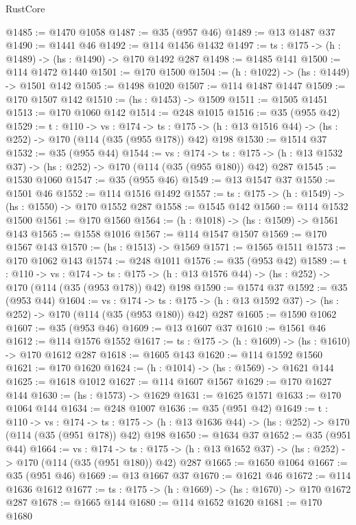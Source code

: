 \begin{lexlean}{RustCore}
\begin{coremodule}
@1485 := @1470 @1058
@1487 := @35 (@957 @46)
@1489 := @13 @1487 @37
@1490 := @1441 @46
@1492 := @114 @1456 @1432
@1497 := {ts : @175} -> (h : @1489) -> (hs : @1490) -> @170 @1492 @287
@1498 := @1485 @141
@1500 := @114 @1472 @1440
@1501 := @170 @1500
@1504 := (h : @1022) -> (hs : @1449) -> @1501 @142
@1505 := @1498 @1020
@1507 := @114 @1487 @1447
@1509 := @170 @1507 @142
@1510 := (hs : @1453) -> @1509
@1511 := @1505 @1451
@1513 := @170 @1060 @142
@1514 := @248 @1015
@1516 := @35 (@955 @42)
@1529 := {t : @110} ->
  {vs : @174} ->
  {ts : @175} -> (h : @13 @1516 @44) -> (hs : @252) -> @170 (@114 (@35 (@955 @178)) @42) @198
@1530 := @1514 @37
@1532 := @35 (@955 @44)
@1544 := {vs : @174} ->
  {ts : @175} -> (h : @13 @1532 @37) -> (hs : @252) -> @170 (@114 (@35 (@955 @180)) @42) @287
@1545 := @1530 @1060
@1547 := @35 (@955 @46)
@1549 := @13 @1547 @37
@1550 := @1501 @46
@1552 := @114 @1516 @1492
@1557 := {ts : @175} -> (h : @1549) -> (hs : @1550) -> @170 @1552 @287
@1558 := @1545 @142
@1560 := @114 @1532 @1500
@1561 := @170 @1560
@1564 := (h : @1018) -> (hs : @1509) -> @1561 @143
@1565 := @1558 @1016
@1567 := @114 @1547 @1507
@1569 := @170 @1567 @143
@1570 := (hs : @1513) -> @1569
@1571 := @1565 @1511
@1573 := @170 @1062 @143
@1574 := @248 @1011
@1576 := @35 (@953 @42)
@1589 := {t : @110} ->
  {vs : @174} ->
  {ts : @175} -> (h : @13 @1576 @44) -> (hs : @252) -> @170 (@114 (@35 (@953 @178)) @42) @198
@1590 := @1574 @37
@1592 := @35 (@953 @44)
@1604 := {vs : @174} ->
  {ts : @175} -> (h : @13 @1592 @37) -> (hs : @252) -> @170 (@114 (@35 (@953 @180)) @42) @287
@1605 := @1590 @1062
@1607 := @35 (@953 @46)
@1609 := @13 @1607 @37
@1610 := @1561 @46
@1612 := @114 @1576 @1552
@1617 := {ts : @175} -> (h : @1609) -> (hs : @1610) -> @170 @1612 @287
@1618 := @1605 @143
@1620 := @114 @1592 @1560
@1621 := @170 @1620
@1624 := (h : @1014) -> (hs : @1569) -> @1621 @144
@1625 := @1618 @1012
@1627 := @114 @1607 @1567
@1629 := @170 @1627 @144
@1630 := (hs : @1573) -> @1629
@1631 := @1625 @1571
@1633 := @170 @1064 @144
@1634 := @248 @1007
@1636 := @35 (@951 @42)
@1649 := {t : @110} ->
  {vs : @174} ->
  {ts : @175} -> (h : @13 @1636 @44) -> (hs : @252) -> @170 (@114 (@35 (@951 @178)) @42) @198
@1650 := @1634 @37
@1652 := @35 (@951 @44)
@1664 := {vs : @174} ->
  {ts : @175} -> (h : @13 @1652 @37) -> (hs : @252) -> @170 (@114 (@35 (@951 @180)) @42) @287
@1665 := @1650 @1064
@1667 := @35 (@951 @46)
@1669 := @13 @1667 @37
@1670 := @1621 @46
@1672 := @114 @1636 @1612
@1677 := {ts : @175} -> (h : @1669) -> (hs : @1670) -> @170 @1672 @287
@1678 := @1665 @144
@1680 := @114 @1652 @1620
@1681 := @170 @1680

\end{coremodule}
\end{lexlean}

